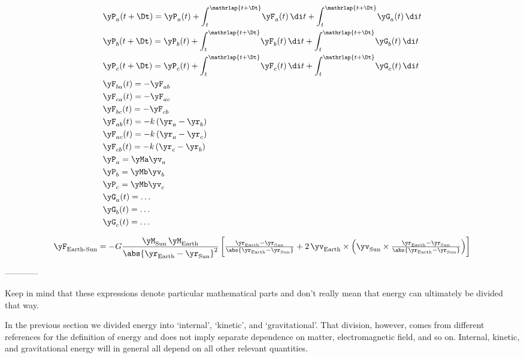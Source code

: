 $$
\begin{aligned}
  &\yP_a(t+\Dt) = \yP_a(t) + \int_{t}^{\mathrlap{t+\Dt}}\!\yF_a(t)\,\di t + \int_{t}^{\mathrlap{t+\Dt}}\!\yG_a(t)\,\di t
  \\
  &\yP_b(t+\Dt) = \yP_b(t) + \int_{t}^{\mathrlap{t+\Dt}}\!\yF_b(t)\,\di t + \int_{t}^{\mathrlap{t+\Dt}}\!\yG_b(t)\,\di t
  \\
  &\yP_c(t+\Dt) = \yP_c(t) + \int_{t}^{\mathrlap{t+\Dt}}\!\yF_c(t)\,\di t + \int_{t}^{\mathrlap{t+\Dt}}\!\yG_c(t)\,\di t
  \\
  &\yF_{ba}(t) = -\yF_{ab}
  \\
  &\yF_{ca}(t) = -\yF_{ac}
  \\
  &\yF_{bc}(t) = -\yF_{cb}
  \\
  &\yF_{ab}(t) = -k\, (\yr_{a}-\yr_{b})
  \\
  &\yF_{ac}(t) = -k\, (\yr_{a}-\yr_{c})
  \\
  &\yF_{cb}(t) = -k\, (\yr_{c}-\yr_{b})
  \\
  &\yP_{a} = \yMa \yv_{a}
  \\
  &\yP_{b} = \yMb \yv_{b}
  \\
  &\yP_{c} = \yMb \yv_{c}
  \\
  &\yG_{a}(t) = \dotso
  \\
  &\yG_{b}(t) = \dotso
  \\
  &\yG_{c}(t) = \dotso
\end{aligned}
$$


$$
\yF_{\text{Earth-Sun}} =
-G\frac{\yM_{\text{Sun}}\,\yM_{\text{Earth}}}{\abs{\yr_{\text{Earth}} - \yr_{\text{Sun}}}^2}\,
 \biggl[
 \tfrac{\yr_{\text{Earth}} - \yr_{\text{Sun}}}{\abs{\yr_{\text{Earth}} - \yr_{\text{Sun}}}}
 +2\,
 \yv_{\text{Earth}} \times \Bigl(\yv_{\text{Sun}} \times
 \tfrac{\yr_{\text{Earth}} - \yr_{\text{Sun}}}{\abs{\yr_{\text{Earth}} - \yr_{\text{Sun}}}}
\Bigr)
 \biggr]
 $$

 ------------


Keep in mind that these expressions denote particular mathematical parts and don't really mean that energy can ultimately be divided that way.

In the previous section we divided energy into \enquote*{internal}, \enquote*{kinetic}, and \enquote*{gravitational}. That division, however, comes from different references for the definition of energy and does not imply separate dependence on matter, electromagnetic field, and so on. Internal, kinetic, and gravitational energy will in general all depend on all other relevant quantities.

